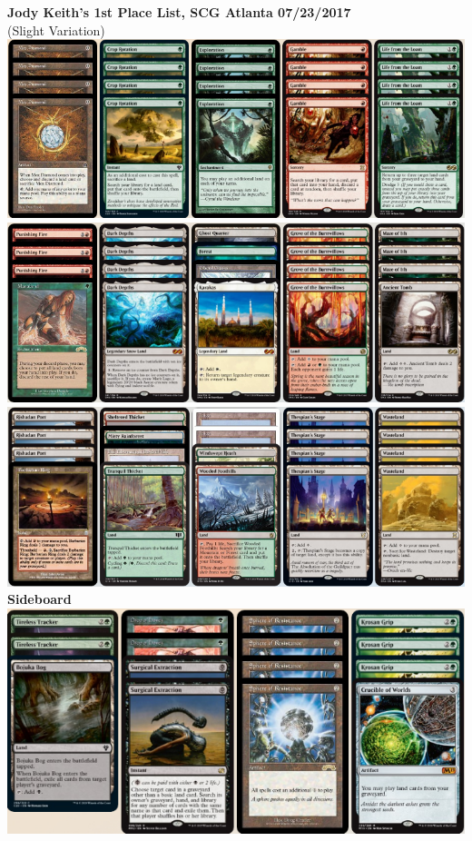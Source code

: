 \documentclass{report}
\begin{document}
\begin{center}
\textbf{Jody Keith's 1st Place List, SCG Atlanta 07/23/2017}\\ (Slight Variation)
\includegraphics[width=\textwidth]{jodykeithlist1}
\includegraphics[width=\textwidth]{jodykeithlist2}
\includegraphics[width=\textwidth]{jodykeithlist3}
\newpage
\textbf{Sideboard}
\includegraphics[width=\textwidth]{jodykeithlistsb}
\end{center}
\end{document}
